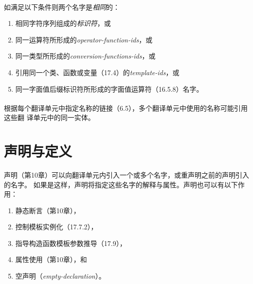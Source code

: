 \paragraph{}
如满足以下条件则两个名字是\textit{相同}的：
\begin{enumerate}
  \item{相同字符序列组成的\textit{标识符}，或}
  \item{同一运算符所形成的\textit{operator-function-ids}，或}
  \item{同一类型所形成的\textit{conversion-functions-ids}，或}
  \item{引用同一个类、函数或变量（17.4）的\textit{template-ids}，或}
  \item{同一字面值后缀标识符所形成的字面值运算符（16.5.8）名字。}
\end{enumerate}

\paragraph{}
根据每个翻译单元中指定名称的链接（6.5），多个翻译单元中使用的名称可能引用这些翻
译单元中的同一实体。


\section{声明与定义}

\paragraph{}
声明（第10章）可以向翻译单元内引入一个或多个名字，或重声明之前的声明引入的名字。
如果是这样，声明将指定这些名字的解释与属性。声明也可以有以下作用：
\begin{enumerate}
  \item{静态断言（第10章），}
  \item{控制模板实例化（17.7.2），}
  \item{指导构造函数模板参数推导（17.9），}
  \item{属性使用（第10章），和}
  \item{空声明（\textit{empty-declaration}）。}
\end{enumerate}

